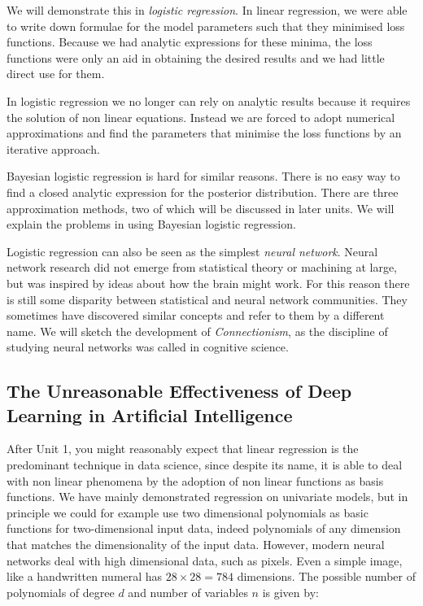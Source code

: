 We will demonstrate this in \emph{logistic regression}. In linear regression, we were able to write
down formulae for the model parameters such that they minimised loss functions. Because we had
analytic expressions for these minima, the loss functions were only an aid in obtaining the desired results and
we had little direct use for them.

In logistic regression we no longer can rely on analytic results because it requires the solution of
non linear equations. Instead we are forced to adopt numerical approximations and find the parameters
that minimise the loss functions by an iterative approach.

Bayesian logistic regression is hard for similar reasons. There is no easy way to find a closed analytic
expression for the posterior distribution. There are three approximation methods, two of which will
be discussed in later units. We will explain the problems  in using Bayesian logistic regression.

Logistic regression can also be seen as the simplest \emph{neural network}. Neural network research
did not emerge from statistical theory or machining at large, but was inspired by ideas about how
the brain might work. For this reason there is still some disparity between statistical and
neural network communities. They sometimes have discovered similar concepts and refer to them by a different
name. We will sketch the development of \emph{Connectionism}, as the discipline of studying neural networks
was called in cognitive science.

\subsection{The Unreasonable Effectiveness of Deep Learning in Artificial Intelligence}
After Unit 1, you might reasonably expect that linear regression is the predominant technique in data science,
since despite its name, it is able to deal with non linear phenomena by the adoption of non linear
functions as basis functions. We have mainly demonstrated regression on univariate models, but in principle
we could for example use two dimensional polynomials as basic functions for two-dimensional
input data, indeed polynomials of any dimension that matches the dimensionality of the input data.
However, modern neural networks deal with
high dimensional data, such as pixels. Even a simple image, like a handwritten numeral has $28 \times 28 = 784$
dimensions. The possible number of polynomials of degree $d$ and number of variables $n$ is given by:

